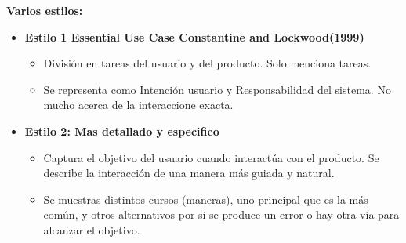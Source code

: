 \documentclass[12pt]{report} %
\begin{document}
\textbf{Varios estilos:}

\begin{itemize}
	\item \textbf{Estilo 1 Essential Use Case Constantine and Lockwood(1999)}
		\begin{itemize}
			\item División en tareas del usuario y del producto. Solo menciona tareas.
			\item Se representa como Intención usuario y Responsabilidad del sistema. No mucho acerca de la interaccione exacta.
		\end{itemize}
	\item \textbf{Estilo 2: Mas detallado y especifico}
		\begin{itemize}
			\item Captura el objetivo del usuario cuando interactúa con el producto. Se describe la interacción de una manera más guiada y natural.
			\item Se muestras distintos cursos (maneras), uno principal que es la más común, y otros alternativos por si se produce un error o hay otra vía para alcanzar el objetivo.
		\end{itemize}
\end{itemize}
\end{document}

